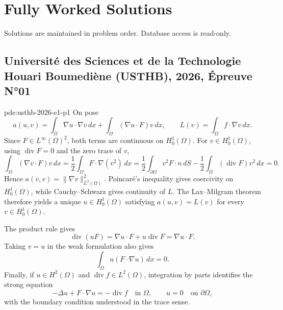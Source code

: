 \chapter{Fully Worked Solutions}
\label{ch:solutions}

Solutions are maintained in problem order. Database access is read-only.

\section{Université des Sciences et de la Technologie Houari Boumediène (USTHB), 2026, Épreuve N°01}
\begin{solution}{pde:usthb-2026-e1-p1}
On pose
\[
a(u,v)=\int_\Omega \nabla u\cdot\nabla v\,dx+
\int_\Omega (\nabla u\cdot F)v\,dx,
\qquad
L(v)=\int_\Omega f\cdot\nabla v\,dx.
\]
Since $F\in L^\infty(\Omega)^2$, both terms are continuous on $H_0^1(\Omega)$. For $v\in H_0^1(\Omega)$, using $\operatorname{div}F=0$ and the zero trace of $v$,
\[
\int_\Omega (\nabla v\cdot F)v\,dx
=\frac12\int_\Omega F\cdot\nabla(v^2)\,dx
=\frac12\int_{\partial\Omega}v^2F\cdot n\,dS-
\frac12\int_\Omega (\operatorname{div}F)v^2\,dx=0.
\]
Hence $a(v,v)=\|\nabla v\|_{L^2(\Omega)}^2$. Poincaré's inequality gives coercivity on $H_0^1(\Omega)$, while Cauchy--Schwarz gives continuity of $L$. The Lax--Milgram theorem therefore yields a unique $u\in H_0^1(\Omega)$ satisfying $a(u,v)=L(v)$ for every $v\in H_0^1(\Omega)$.

The product rule gives
\[
\operatorname{div}(uF)=\nabla u\cdot F+u\operatorname{div}F=\nabla u\cdot F.
\]
Taking $v=u$ in the weak formulation also gives
\[
\int_\Omega u(F\cdot\nabla u)\,dx=0.
\]
Finally, if $u\in H^2(\Omega)$ and $\operatorname{div}f\in L^2(\Omega)$, integration by parts identifies the strong equation
\[
-\Delta u+F\cdot\nabla u=-\operatorname{div}f\quad\text{in }\Omega,
\qquad u=0\quad\text{on }\partial\Omega,
\]
with the boundary condition understood in the trace sense.
\end{solution}
